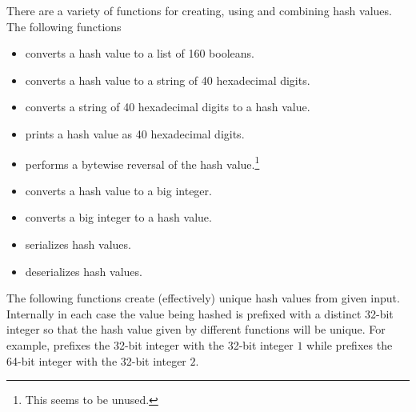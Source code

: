 There are a variety of functions for creating, using and combining hash values.
The following functions 
\begin{itemize}
\item {} converts a hash value to a list of 160 booleans.
\item {} converts a hash value to a string of 40 hexadecimal digits.
\item {} converts a string of 40 hexadecimal digits to a hash value.
\item {} prints a hash value as 40 hexadecimal digits.
\item {} performs a bytewise reversal of the hash value.\footnote{This seems to be unused.}
\item {} converts a hash value to a big integer.
\item {} converts a big integer to a hash value.
\item {} serializes hash values.
\item {} deserializes hash values.
\end{itemize}
The following functions create (effectively) unique hash values from given input.
Internally in each case the value being hashed is prefixed with a distinct 32-bit
integer so that the hash value given by different functions will be unique.
For example, {} prefixes the 32-bit integer with the 32-bit integer $1$
while {} prefixes the 64-bit integer with the 32-bit integer $2$.

